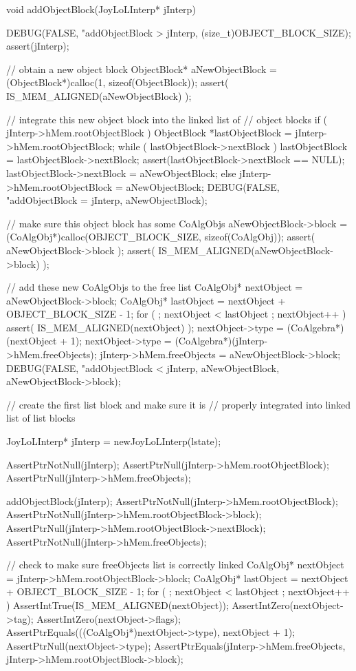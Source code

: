 \startCCode
void addObjectBlock(JoyLoLInterp* jInterp) {
  DEBUG(FALSE, "addObjectBlock > %
    jInterp, (size_t)OBJECT_BLOCK_SIZE);
  assert(jInterp);
  
  // obtain a new object block
  ObjectBlock* aNewObjectBlock = 
    (ObjectBlock*)calloc(1, sizeof(ObjectBlock));
  assert( IS_MEM_ALIGNED(aNewObjectBlock) );

  // integrate this new object block into the linked list of
  // object blocks
  if ( jInterp->hMem.rootObjectBlock ) {
    ObjectBlock *lastObjectBlock = jInterp->hMem.rootObjectBlock;
    while ( lastObjectBlock->nextBlock ) {
      lastObjectBlock = lastObjectBlock->nextBlock;
    }
    assert(lastObjectBlock->nextBlock == NULL);
    lastObjectBlock->nextBlock = aNewObjectBlock;
  } else {
    jInterp->hMem.rootObjectBlock = aNewObjectBlock;
  }
  DEBUG(FALSE, "addObjectBlock = %
    jInterp, aNewObjectBlock);

  // make sure this object block has some CoAlgObjs
  aNewObjectBlock->block = 
    (CoAlgObj*)calloc(OBJECT_BLOCK_SIZE, sizeof(CoAlgObj));
  assert( aNewObjectBlock->block );
  assert( IS_MEM_ALIGNED(aNewObjectBlock->block) );

  // add these new CoAlgObjs to the free list
  CoAlgObj* nextObject = aNewObjectBlock->block;
  CoAlgObj* lastObject = nextObject + OBJECT_BLOCK_SIZE - 1;
  for ( ; nextObject < lastObject ; nextObject++ ) {
    assert( IS_MEM_ALIGNED(nextObject) );
    nextObject->type = (CoAlgebra*)(nextObject + 1);
  }
  nextObject->type = (CoAlgebra*)(jInterp->hMem.freeObjects);
  jInterp->hMem.freeObjects = aNewObjectBlock->block;
  DEBUG(FALSE, "addObjectBlock < %
    jInterp, aNewObjectBlock, aNewObjectBlock->block);
}
\stopCCode

\startCTest
  // create the first list block and make sure it is 
  // properly integrated into linked list of list blocks

  JoyLoLInterp* jInterp = newJoyLoLInterp(lstate);

  AssertPtrNotNull(jInterp);
  AssertPtrNull(jInterp->hMem.rootObjectBlock);
  AssertPtrNull(jInterp->hMem.freeObjects);

  addObjectBlock(jInterp);
  AssertPtrNotNull(jInterp->hMem.rootObjectBlock);
  AssertPtrNotNull(jInterp->hMem.rootObjectBlock->block);
  AssertPtrNull(jInterp->hMem.rootObjectBlock->nextBlock);
  AssertPtrNotNull(jInterp->hMem.freeObjects);

  // check to make sure freeObjects list is correctly linked
  CoAlgObj* nextObject = jInterp->hMem.rootObjectBlock->block;
  CoAlgObj* lastObject = nextObject + OBJECT_BLOCK_SIZE - 1;
  for ( ; nextObject < lastObject ; nextObject++ ) {
    AssertIntTrue(IS_MEM_ALIGNED(nextObject));
    AssertIntZero(nextObject->tag);
    AssertIntZero(nextObject->flags);
    AssertPtrEquals(((CoAlgObj*)nextObject->type), nextObject + 1);
  }
  AssertPtrNull(nextObject->type);
  AssertPtrEquals(jInterp->hMem.freeObjects,
    jInterp->hMem.rootObjectBlock->block);

